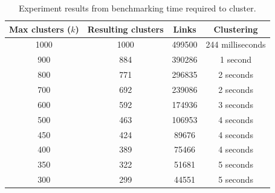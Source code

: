 \begin{table}[H]
    \begin{tabular}{|c|c|c|c|}\hline
        Max clusters ($k$) & Resulting clusters & Links  & Clustering       \\\hline%
        1000               & 1000               & 499500 & 244 milliseconds \\\hline%
        900                & 884                & 390286 & 1 second         \\\hline%
        800                & 771                & 296835 & 2 seconds        \\\hline%
        700                & 692                & 239086 & 2 seconds        \\\hline%
        600                & 592                & 174936 & 3 seconds        \\\hline%
        500                & 463                & 106953 & 4 seconds        \\\hline%
        450                & 424                & 89676  & 4 seconds        \\\hline%
        400                & 389                & 75466  & 4 seconds        \\\hline%
        350                & 322                & 51681  & 5 seconds        \\\hline%
        300                & 299                & 44551  & 5 seconds        \\\hline%
    \end{tabular}
    \caption{Experiment results from benchmarking time required to cluster.}
    \label{table:clustering-benchmark}
\end{table}

